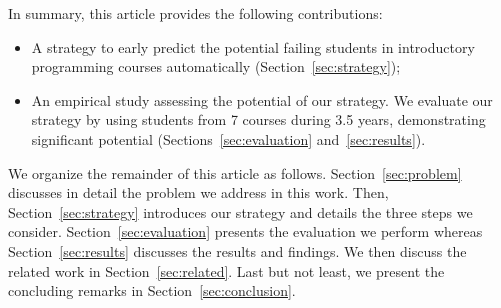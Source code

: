 In summary, this article provides the following contributions:

\begin{itemize}

	\item A strategy to early predict the potential failing students in introductory programming courses automatically (Section~\ref{sec:strategy});
	
	\item An empirical study assessing the potential of our strategy. We evaluate our strategy by using \totalStudents students from 7 courses during 3.5 years, demonstrating significant potential (Sections~\ref{sec:evaluation} and~\ref{sec:results}).

\end{itemize}

We organize the remainder of this article as follows. Section~\ref{sec:problem} discusses in detail the problem we address in this work. Then, Section~\ref{sec:strategy} introduces our strategy and details the three steps we consider. Section~\ref{sec:evaluation} presents the evaluation we perform whereas Section~\ref{sec:results} discusses the results and findings. We then discuss the related work in Section~\ref{sec:related}. Last but not least, we present the concluding remarks in Section~\ref{sec:conclusion}.
